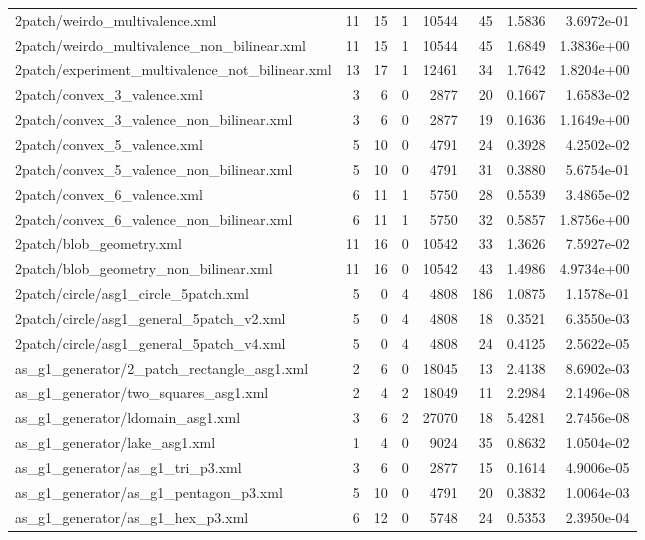 \documentclass[11pt,a4paper]{article}
\begin{document}
\begin{longtable}{>{\ttfamily\scriptsize\raggedright\arraybackslash}p{8.4cm}rrrrrrr}
2patch/weirdo\_multivalence.xml & 11 & 15 & 1 & 10544 & 45 & 1.5836 & 3.6972e-01 \\
2patch/weirdo\_multivalence\_non\_bilinear.xml & 11 & 15 & 1 & 10544 & 45 & 1.6849 & 1.3836e+00 \\
2patch/experiment\_multivalence\_not\_bilinear.xml & 13 & 17 & 1 & 12461 & 34 & 1.7642 & 1.8204e+00 \\
2patch/convex\_3\_valence.xml & 3 & 6 & 0 & 2877 & 20 & 0.1667 & 1.6583e-02 \\
2patch/convex\_3\_valence\_non\_bilinear.xml & 3 & 6 & 0 & 2877 & 19 & 0.1636 & 1.1649e+00 \\
2patch/convex\_5\_valence.xml & 5 & 10 & 0 & 4791 & 24 & 0.3928 & 4.2502e-02 \\
2patch/convex\_5\_valence\_non\_bilinear.xml & 5 & 10 & 0 & 4791 & 31 & 0.3880 & 5.6754e-01 \\
2patch/convex\_6\_valence.xml & 6 & 11 & 1 & 5750 & 28 & 0.5539 & 3.4865e-02 \\
2patch/convex\_6\_valence\_non\_bilinear.xml & 6 & 11 & 1 & 5750 & 32 & 0.5857 & 1.8756e+00 \\
2patch/blob\_geometry.xml & 11 & 16 & 0 & 10542 & 33 & 1.3626 & 7.5927e-02 \\
2patch/blob\_geometry\_non\_bilinear.xml & 11 & 16 & 0 & 10542 & 43 & 1.4986 & 4.9734e+00 \\
2patch/circle/asg1\_circle\_5patch.xml & 5 & 0 & 4 & 4808 & 186 & 1.0875 & 1.1578e-01 \\
2patch/circle/asg1\_general\_5patch\_v2.xml & 5 & 0 & 4 & 4808 & 18 & 0.3521 & 6.3550e-03 \\
2patch/circle/asg1\_general\_5patch\_v4.xml & 5 & 0 & 4 & 4808 & 24 & 0.4125 & 2.5622e-05 \\
as\_g1\_generator/2\_patch\_rectangle\_asg1.xml & 2 & 6 & 0 & 18045 & 13 & 2.4138 & 8.6902e-03 \\
as\_g1\_generator/two\_squares\_asg1.xml & 2 & 4 & 2 & 18049 & 11 & 2.2984 & 2.1496e-08 \\
as\_g1\_generator/ldomain\_asg1.xml & 3 & 6 & 2 & 27070 & 18 & 5.4281 & 2.7456e-08 \\
as\_g1\_generator/lake\_asg1.xml & 1 & 4 & 0 & 9024 & 35 & 0.8632 & 1.0504e-02 \\
as\_g1\_generator/as\_g1\_tri\_p3.xml & 3 & 6 & 0 & 2877 & 15 & 0.1614 & 4.9006e-05 \\
as\_g1\_generator/as\_g1\_pentagon\_p3.xml & 5 & 10 & 0 & 4791 & 20 & 0.3832 & 1.0064e-03 \\
as\_g1\_generator/as\_g1\_hex\_p3.xml & 6 & 12 & 0 & 5748 & 24 & 0.5353 & 2.3950e-04 \\

\end{longtable}
\end{document}
